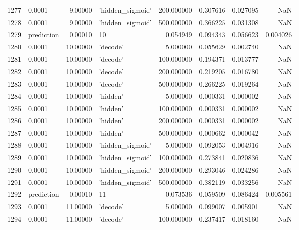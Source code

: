 \documentclass[10pt,a4paper]{article}
\begin{document}
\begin{tabular}{llrlrrrr}
1277 &      0.0001 &   9.00000 &   'hidden\_sigmoid' &  200.000000 &  0.307616 &  0.027095 &       NaN \\
1278 &      0.0001 &   9.00000 &   'hidden\_sigmoid' &  500.000000 &  0.366225 &  0.031308 &       NaN \\
1279 &  prediction &   0.00010 &                 10 &    0.054949 &  0.094343 &  0.056623 &  0.004026 \\
1280 &      0.0001 &  10.00000 &           'decode' &    5.000000 &  0.055629 &  0.002740 &       NaN \\
1281 &      0.0001 &  10.00000 &           'decode' &  100.000000 &  0.194371 &  0.013777 &       NaN \\
1282 &      0.0001 &  10.00000 &           'decode' &  200.000000 &  0.219205 &  0.016780 &       NaN \\
1283 &      0.0001 &  10.00000 &           'decode' &  500.000000 &  0.266225 &  0.019264 &       NaN \\
1284 &      0.0001 &  10.00000 &           'hidden' &    5.000000 &  0.000331 &  0.000002 &       NaN \\
1285 &      0.0001 &  10.00000 &           'hidden' &  100.000000 &  0.000331 &  0.000002 &       NaN \\
1286 &      0.0001 &  10.00000 &           'hidden' &  200.000000 &  0.000331 &  0.000002 &       NaN \\
1287 &      0.0001 &  10.00000 &           'hidden' &  500.000000 &  0.000662 &  0.000042 &       NaN \\
1288 &      0.0001 &  10.00000 &   'hidden\_sigmoid' &    5.000000 &  0.092053 &  0.004916 &       NaN \\
1289 &      0.0001 &  10.00000 &   'hidden\_sigmoid' &  100.000000 &  0.273841 &  0.020836 &       NaN \\
1290 &      0.0001 &  10.00000 &   'hidden\_sigmoid' &  200.000000 &  0.293046 &  0.024286 &       NaN \\
1291 &      0.0001 &  10.00000 &   'hidden\_sigmoid' &  500.000000 &  0.382119 &  0.033256 &       NaN \\
1292 &  prediction &   0.00010 &                 11 &    0.073536 &  0.059509 &  0.086424 &  0.005561 \\
1293 &      0.0001 &  11.00000 &           'decode' &    5.000000 &  0.099007 &  0.005901 &       NaN \\
1294 &      0.0001 &  11.00000 &           'decode' &  100.000000 &  0.237417 &  0.018160 &       NaN \\

\end{tabular}
\end{document}
